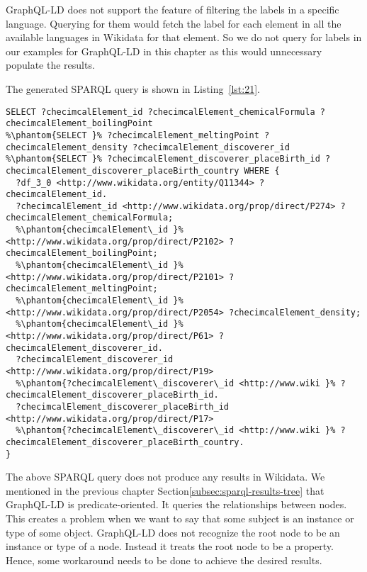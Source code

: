 GraphQL-LD does not support the feature of filtering the labels in a specific language. Querying for them would fetch the label for each element in all the available languages in Wikidata for that element. So we do not query for labels in our examples for GraphQL-LD in this chapter as this would unnecessary populate the results.

The generated SPARQL query is shown in Listing~\ref{lst:21}. 

\begin{minipage}{\linewidth}
\begin{lstlisting}[columns=fullflexible, label=lst:21, caption={The generated SPARQL query in GraphQL-LD}, language=SPARQL]
SELECT ?checimcalElement_id ?checimcalElement_chemicalFormula ?checimcalElement_boilingPoint
%\phantom{SELECT }% ?checimcalElement_meltingPoint ?checimcalElement_density ?checimcalElement_discoverer_id 
%\phantom{SELECT }% ?checimcalElement_discoverer_placeBirth_id ?checimcalElement_discoverer_placeBirth_country WHERE {
  ?df_3_0 <http://www.wikidata.org/entity/Q11344> ?checimcalElement_id.
  ?checimcalElement_id <http://www.wikidata.org/prop/direct/P274> ?checimcalElement_chemicalFormula;
  %\phantom{checimcalElement\_id }% <http://www.wikidata.org/prop/direct/P2102> ?checimcalElement_boilingPoint;
  %\phantom{checimcalElement\_id }% <http://www.wikidata.org/prop/direct/P2101> ?checimcalElement_meltingPoint;
  %\phantom{checimcalElement\_id }% <http://www.wikidata.org/prop/direct/P2054> ?checimcalElement_density;
  %\phantom{checimcalElement\_id }% <http://www.wikidata.org/prop/direct/P61> ?checimcalElement_discoverer_id.
  ?checimcalElement_discoverer_id <http://www.wikidata.org/prop/direct/P19>
  %\phantom{?checimcalElement\_discoverer\_id <http://www.wiki }% ?checimcalElement_discoverer_placeBirth_id.
  ?checimcalElement_discoverer_placeBirth_id <http://www.wikidata.org/prop/direct/P17>
  %\phantom{?checimcalElement\_discoverer\_id <http://www.wiki }% ?checimcalElement_discoverer_placeBirth_country.
}
\end{lstlisting}
\end{minipage}

The above SPARQL query does not produce any results in Wikidata. We mentioned in the previous chapter Section\ref{subsec:sparql-results-tree} that GraphQL-LD is predicate-oriented. It queries the relationships between nodes. This creates a problem when we want to say that some subject is an instance or type of some object. GraphQL-LD does not recognize the root node to be an instance or type of a node. Instead it treats the root node to be a property. Hence, some workaround needs to be done to achieve the desired results.

